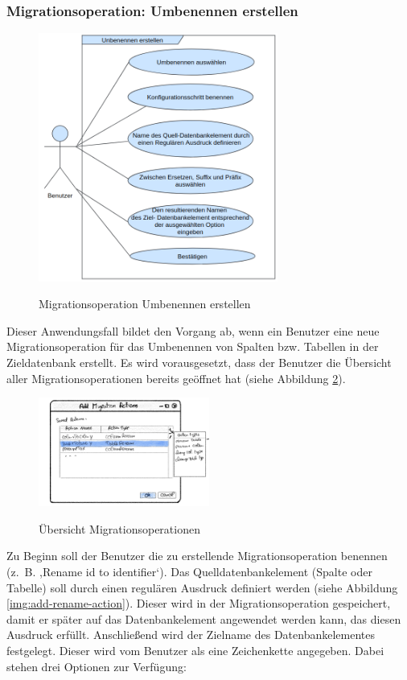 \subsubsection{Migrationsoperation: Umbenennen erstellen}
\label{section:umbenennen}
\begin{figure}[H]
	\caption{Migrationsoperation \glqq Umbenennen \grqq erstellen}
	\centering
	\includegraphics[width=0.7\textwidth]{images/af/af-umbenennen}
	\label{img:af-umbenennen}
\end{figure}
Dieser Anwendungsfall bildet den Vorgang ab, wenn ein Benutzer eine neue Migrationsoperation für das Umbenennen von Spalten bzw. Tabellen in der Zieldatenbank erstellt. Es wird vorausgesetzt, dass der Benutzer die Übersicht aller Migrationsoperationen bereits geöffnet hat (siehe Abbildung \ref{img:actions-overview}). \\
\begin{figure}[H]
	\caption{Übersicht Migrationsoperationen}
	\centering
	\includegraphics[width=0.5\textwidth]{images/actions-overview}
	\label{img:actions-overview}
\end{figure}
Zu Beginn soll der Benutzer die zu erstellende Migrationsoperation benennen (z. B. ,Rename id to identifier‘). Das Quelldatenbankelement (Spalte oder Tabelle) soll durch einen regulären Ausdruck definiert werden (siehe Abbildung \ref{img:add-rename-action}). Dieser wird in der Migrationsoperation gespeichert, damit er später auf das Datenbankelement angewendet werden kann, das diesen Ausdruck erfüllt. Anschließend wird der Zielname des Datenbankelementes festgelegt. Dieser wird vom Benutzer als eine Zeichenkette angegeben. Dabei stehen drei Optionen zur Verfügung:
